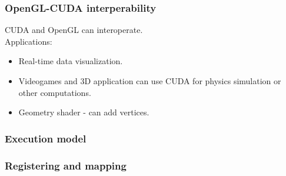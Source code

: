 \begin{frame}[fragile]

\frametitle{OpenGL-CUDA interperability}

CUDA and OpenGL can interoperate.
\newline
\\

Applications:
\begin{itemize}
    \item{Real-time data visualization.}
    \item{Videogames and 3D application can use CUDA for physics simulation or other computations.}
    \item{Geometry shader - can add vertices.}
\end{itemize}

\end{frame}

\begin{frame}[fragile]

\frametitle{Execution model}


\end{frame}

\begin{frame}[fragile]

\frametitle{Registering and mapping}


\end{frame}


